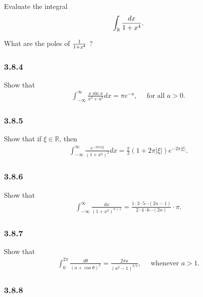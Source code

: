 Evaluate the integral
\begin{align*}
\int_{\mathbb{R}}{dx \over 1 + x^4}
.\end{align*}

What are the poles of \({1\over 1 + z^4}\) ?

\hypertarget{section-57}{%
\subsubsection{3.8.4}\label{section-57}}

Show that
\begin{align*}
\int_{-\infty}^{\infty} \frac{x \sin x}{x^{2}+a^{2}} d x=\pi e^{-a}, \quad \text { for all } a>0
.\end{align*}

\hypertarget{section-58}{%
\subsubsection{3.8.5}\label{section-58}}

Show that if \(\xi\in {\mathbb{R}}\), then
\begin{align*}
\int_{-\infty}^{\infty} \frac{e^{-2 \pi i x \xi}}{\left(1+x^{2}\right)^{2}} d x=\frac{\pi}{2}(1+2 \pi|\xi|) e^{-2 \pi|\xi|}
.\end{align*}

\hypertarget{section-59}{%
\subsubsection{3.8.6}\label{section-59}}

Show that
\begin{align*}
\int_{-\infty}^{\infty} \frac{d x}{\left(1+x^{2}\right)^{n+1}}=\frac{1 \cdot 3 \cdot 5 \cdots(2 n-1)}{2 \cdot 4 \cdot 6 \cdots(2 n)} \cdot \pi
.\end{align*}

\hypertarget{section-60}{%
\subsubsection{3.8.7}\label{section-60}}

Show that
\begin{align*}
\int_{0}^{2 \pi} \frac{d \theta}{(a+\cos \theta)^{2}}=\frac{2 \pi a}{\left(a^{2}-1\right)^{3 / 2}}, \quad \text { whenever } a>1
.\end{align*}

\hypertarget{section-61}{%
\subsubsection{3.8.8}\label{section-61}}

